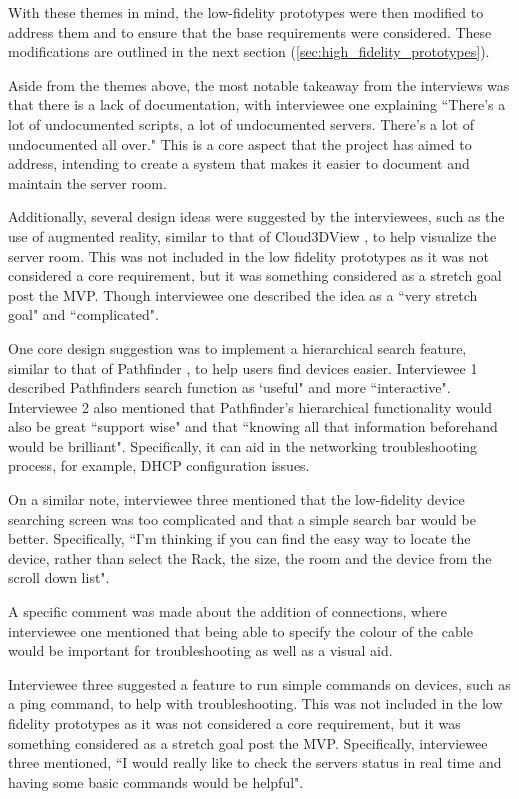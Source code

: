 \documentclass [11pt,a4paper]{article}
\begin{document}
With these themes in mind, the low-fidelity prototypes were then modified to address them and to ensure that the base requirements were considered. These modifications are outlined in the next section (\ref{sec:high_fidelity_prototypes}). 


Aside from the themes above, the most notable takeaway from the interviews was that there is a lack of documentation, with interviewee one explaining ``There's a lot of undocumented scripts, a lot of undocumented servers. There's a lot of undocumented all over." This is a core aspect that the project has aimed to address, intending to create a system that makes it easier to document and maintain the server room. 

Additionally, several design ideas were suggested by the interviewees, such as the use of augmented reality, similar to that of Cloud3DView \cite{cloud3dview}, to help visualize the server room. This was not included in the low fidelity prototypes as it was not considered a core requirement, but it was something considered as a stretch goal post the MVP. Though interviewee one described the idea as a ``very stretch goal" and ``complicated".

One core design suggestion was to implement a hierarchical search feature, similar to that of Pathfinder \cite{PathfinderMobile}, to help users find devices easier. Interviewee 1 described Pathfinders search function as `useful" and more ``interactive". Interviewee 2 also mentioned that Pathfinder's hierarchical functionality would also be great ``support wise" and that ``knowing all that information beforehand would be brilliant". Specifically, it can aid in the networking troubleshooting process, for example, DHCP configuration issues.

On a similar note, interviewee three mentioned that the low-fidelity device searching screen was too complicated and that a simple search bar would be better. Specifically, ``I'm thinking if you can find the easy way to locate the device, rather than select the Rack, the size, the room and the device from the scroll down list". 

A specific comment was made about the addition of connections, where interviewee one mentioned that being able to specify the colour of the cable would be important for troubleshooting as well as a visual aid.  

Interviewee three suggested a feature to run simple commands on devices, such as a ping command, to help with troubleshooting. This was not included in the low fidelity prototypes as it was not considered a core requirement, but it was something considered as a stretch goal post the MVP. Specifically, interviewee three mentioned, ``I would really like to check the servers status in real time and having some basic commands would be helpful".
\end{document}
